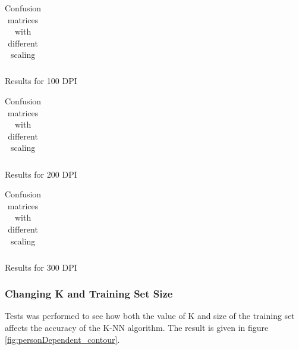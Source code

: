 \begin{table}
    \centering
    \begin{subtable}{0.5\textwidth}
        \flushright
    \end{subtable}

    \begin{subtable}{0.1\textwidth}
        \flushright
    \end{subtable}
    \begin{subtable}{0.6\textwidth}
        \begin{subtable}{\textwidth}
            \centering
            {\scriptsize
                \begin{tabular}{l|*{10}{c}}
                    
                \end{tabular}
            }
            \caption{Results for 100 DPI}
        \end{subtable}
        \begin{subtable}{\textwidth}
            \centering
            {\scriptsize
                \begin{tabular}{l|*{10}{c}}
                    
                \end{tabular}
            }
            \caption{Results for 200 DPI}
        \end{subtable}
        \begin{subtable}{\textwidth}
            \centering
            {\scriptsize
                \begin{tabular}{l|*{10}{c}}
                    
                \end{tabular}
            }
            \caption{Results for 300 DPI}
        \end{subtable}
    \end{subtable}
    \caption{Confusion matrices with different scaling}
    \label{tb:confus}
\end{table}

\subsubsection{Changing K and Training Set Size}
Tests was performed to see how both the value of K and size of the training set affects the accuracy of the K-NN algorithm. 
The result is given in figure \ref{fig:personDependent_contour}.

